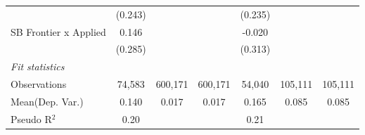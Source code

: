 \begin{tabular}{lcccccc}
                         & (0.243)        &         &         & (0.235)        &         &   \\   
   SB Frontier x Applied & 0.146          &         &         & -0.020         &         &   \\   
                         & (0.285)        &         &         & (0.313)        &         &   \\   
   \midrule
   \emph{Fit statistics}\\
   Observations          & 74,583         & 600,171 & 600,171 & 54,040         & 105,111 & 105,111\\  
Mean(Dep. Var.) & 0.140 & 0.017 & 0.017 & 0.165 & 0.085 & 0.085 \\
   Pseudo R$^2$          & 0.20           &         &         & 0.21           &         & \\  
   

\end{tabular}
